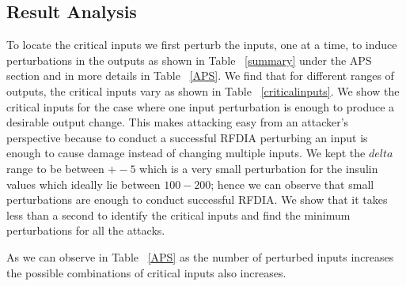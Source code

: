 \subsection{Result Analysis}
To locate the critical inputs we first perturb the inputs, one at a time, to induce perturbations in the outputs as shown in Table ~\ref{summary} under the APS section and in more details in Table ~\ref{APS}. 
We find that for different ranges of outputs, the critical inputs vary as shown in Table ~\ref{criticalinputs}. 
We show the critical inputs for the case where one input perturbation is enough to produce a desirable output change. 
This makes attacking easy from an attacker's perspective because to conduct a successful \ac{RFDIA} perturbing an input is enough to cause damage instead of changing multiple inputs. 
We kept the $delta$ range  to be between $+-5$ which is a very small perturbation for the insulin values which ideally lie between $100-200$; hence we can observe that small perturbations are enough to conduct successful \ac{RFDIA}.    
We show that it takes less than a second to identify the critical inputs and find the minimum perturbations for all the attacks. 

As we can observe in Table ~\ref{APS} as the number of perturbed inputs increases the possible combinations of critical inputs also increases. 












